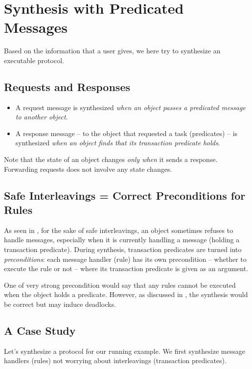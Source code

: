 \documentclass[format=manuscript]{acmart}
\begin{document}
\section{Synthesis with Predicated Messages}

Based on the information that a user gives, we here try to synthesize an
executable protocol.

\subsection{Requests and Responses}

\begin{itemize}
\item A request message is synthesized \emph{when an object passes a predicated
  message to another object}.
\item A response message -- to the object that requested a task (predicates) --
  is synthesized \emph{when an object finds that its transaction predicate
    holds}.
\end{itemize}

Note that the state of an object changes \emph{only when} it sends a response.
Forwarding requests does not involve any state changes.

\subsection{Safe Interleavings = Correct Preconditions for Rules}

As seen in , for the sake of safe interleavings, an object
sometimes refuses to handle messages, especially when it is currently handling a
message (holding a transaction predicate). During synthesis, transaction
predicates are turned into \emph{preconditions}: each message handler (rule) has
its own precondition -- whether to execute the rule or not -- where its
transaction predicate is given as an argument.

One of very strong precondition would say that any rules cannot be executed when
the object holds a predicate. However, as discussed in
, the synthesis would be correct but may induce
deadlocks.

\subsection{A Case Study}

Let's synthesize a protocol for our running example. We first synthesize message
handlers (rules) not worrying about interleavings (transaction predicates).
\end{document}
